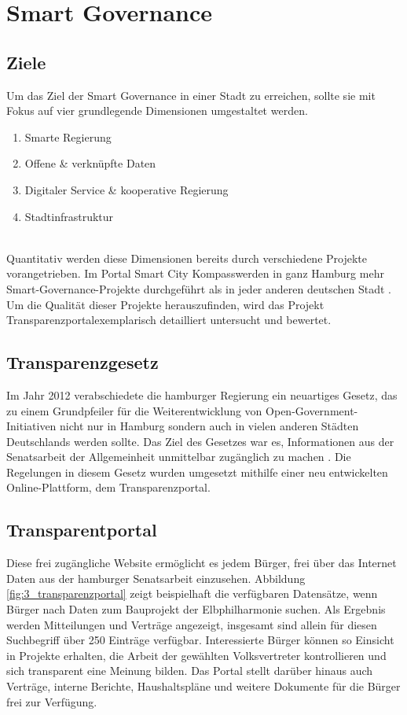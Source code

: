 \section{Smart Governance}
\label{sec:smart_governance}

\subsection{Ziele}
Um das Ziel der Smart Governance in einer Stadt zu erreichen, sollte sie mit Fokus auf vier grundlegende Dimensionen umgestaltet werden.
\begin{enumerate}
	\item Smarte Regierung
	\item Offene \& verknüpfte Daten
	\item Digitaler Service \& kooperative Regierung
	\item Stadtinfrastruktur
\end{enumerate}
\autocite[14]{Fuetterer.2020}
\\ Quantitativ werden diese Dimensionen bereits durch verschiedene Projekte vorangetrieben. Im Portal \glqq Smart City Kompass\grqq\space werden in ganz Hamburg mehr Smart-Governance-Projekte durchgeführt als in jeder anderen deutschen Stadt \autocite{SmartCityKompass.ODA}. Um die Qualität dieser Projekte herauszufinden, wird das Projekt \glqq Transparenzportal\grqq \space exemplarisch detailliert untersucht und bewertet.

\subsection{Transparenzgesetz}

Im Jahr 2012 verabschiedete die hamburger Regierung ein neuartiges Gesetz, das zu einem Grundpfeiler für die Weiterentwicklung von Open-Government-Initiativen nicht nur in Hamburg sondern auch in vielen anderen Städten Deutschlands werden sollte. Das Ziel des Gesetzes war es, Informationen aus der Senatsarbeit der Allgemeinheit unmittelbar zugänglich zu machen \autocite{Senat.2012}. Die Regelungen in diesem Gesetz wurden umgesetzt mithilfe einer neu entwickelten Online-Plattform, dem \glqq Transparenzportal\grqq \space \autocite[127]{Spil.2017}.

\subsection{Transparentportal}

Diese frei zugängliche Website ermöglicht es jedem Bürger, frei über das Internet Daten aus der hamburger Senatsarbeit einzusehen. Abbildung \ref{fig:3_transparenzportal} zeigt beispielhaft die verfügbaren Datensätze, wenn Bürger nach Daten zum Bauprojekt der Elbphilharmonie suchen. Als Ergebnis werden Mitteilungen und Verträge angezeigt, insgesamt sind allein für diesen Suchbegriff über 250 Einträge verfügbar. Interessierte Bürger können so Einsicht in Projekte erhalten, die Arbeit der gewählten Volksvertreter kontrollieren und sich transparent eine Meinung bilden. Das Portal stellt darüber hinaus auch Verträge, interne Berichte, Haushaltspläne und weitere Dokumente für die Bürger frei zur Verfügung.

